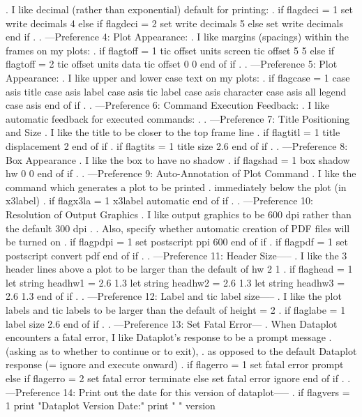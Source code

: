 .    I like decimal (rather than exponential) default for printing:
.
if flagdeci = 1
   set write decimals 4
else if flagdeci = 2
   set write decimals 5
else
   set write decimals
end if
.
. ---Preference 4: Plot Appearance:
.    I like margins (spacings) within the frames on my plots:
.
if flagtoff = 1
   tic offset units screen
   tic offset 5 5
else if flagtoff = 2
   tic offset units data
   tic offset 0 0
end of if
.
. ---Preference 5: Plot Appearance:
.    I like upper and lower case text on my plots:
.
if flagcase = 1
   case asis
   title case asis
   label case asis
   tic label case asis
   character case asis all
   legend case asis
end of if
.
. ---Preference 6: Command Execution Feedback:
.    I like automatic feedback for executed commands:
.
. ---Preference 7: Title Positioning and Size
.    I like the title to be closer to the top frame line
.
if flagtitl = 1
   title displacement 2
end of if
.
if flagtits = 1
   title size 2.6
end of if
.
. ---Preference 8: Box Appearance
.    I like the box to have no shadow
.
if flagshad = 1
   box shadow hw 0 0
end of if
.
. ---Preference 9: Auto-Annotation of Plot Command
.    I like the command which generates a plot to be printed
.    immediately below the plot (in x3label)
.
if flagx3la = 1
   x3label automatic
end of if
.
. ---Preference 10: Resolution of Output Graphics
.    I like output graphics to be 600 dpi rather than the default 300 dpi
.
.    Also, specify whether automatic creation of PDF files will be turned on
.
if flagpdpi = 1
   set postscript ppi 600
end of if
.
if flagpdf = 1
   set postscript convert pdf
end of if
.
. ---Preference 11: Header Size-----
.    I like the 3 header lines above a plot to be larger than the default of     hw 2 1
.
if flaghead = 1
   let string headhw1 = 2.6 1.3
   let string headhw2 = 2.6 1.3
   let string headhw3 = 2.6 1.3
end of if
.
. ---Preference 12: Label and tic label size-----
.    I like the plot labels and tic labels to be larger than the default of    height = 2
.
if flaglabe = 1
   label size 2.6
end of if
.
. ---Preference 13: Set Fatal Error---
.    When Dataplot encounters a fatal error, I like Dataplot's response to be a prompt message
.    (asking as to whether to continue or to exit),
.    as opposed to the default Dataplot response (= ignore and execute onward)
.
if flagerro = 1
   set fatal error prompt
else if flagerro = 2
   set fatal error terminate
else
   set fatal error ignore
end of if
.
. ---Preference 14: Print out the date for this version of dataplot-----
.
if flagvers = 1
   print "Dataplot Version Date:"
   print " "
   version
